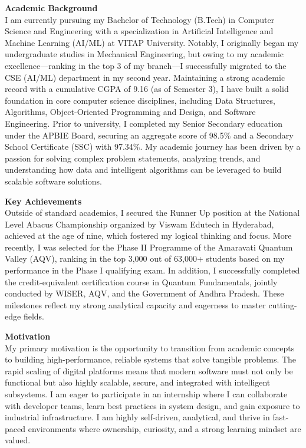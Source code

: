 \documentclass[a4paper,11pt]{article}
\begin{document}
\begin{justify}
\setlength{\parindent}{0pt}
\setlength{\parskip}{1.2em}

\textbf{Academic Background} \\
I am currently pursuing my Bachelor of Technology (B.Tech) in Computer Science and Engineering with a specialization in Artificial Intelligence and Machine Learning (AI/ML) at VITAP University. Notably, I originally began my undergraduate studies in Mechanical Engineering, but owing to my academic excellence—ranking in the top 3 of my branch—I successfully migrated to the CSE (AI/ML) department in my second year. Maintaining a strong academic record with a cumulative CGPA of 9.16 (as of Semester 3), I have built a solid foundation in core computer science disciplines, including Data Structures, Algorithms, Object-Oriented Programming and Design, and Software Engineering. Prior to university, I completed my Senior Secondary education under the APBIE Board, securing an aggregate score of 98.5\% and a Secondary School Certificate (SSC) with 97.34\%. My academic journey has been driven by a passion for solving complex problem statements, analyzing trends, and understanding how data and intelligent algorithms can be leveraged to build scalable software solutions.

\textbf{Key Achievements} \\
Outside of standard academics, I secured the Runner Up position at the National Level Abacus Championship organized by Viswam Edutech in Hyderabad, achieved at the age of nine, which fostered my logical thinking and focus. More recently, I was selected for the Phase II Programme of the Amaravati Quantum Valley (AQV), ranking in the top 3,000 out of 63,000+ students based on my performance in the Phase I qualifying exam. In addition, I successfully completed the credit-equivalent certification course in Quantum Fundamentals, jointly conducted by WISER, AQV, and the Government of Andhra Pradesh. These milestones reflect my strong analytical capacity and eagerness to master cutting-edge fields.

\textbf{Motivation} \\
My primary motivation is the opportunity to transition from academic concepts to building high-performance, reliable systems that solve tangible problems. The rapid scaling of digital platforms means that modern software must not only be functional but also highly scalable, secure, and integrated with intelligent subsystems. I am eager to participate in an internship where I can collaborate with developer teams, learn best practices in system design, and gain exposure to industrial infrastructure. I am highly self-driven, analytical, and thrive in fast-paced environments where ownership, curiosity, and a strong learning mindset are valued.


\end{justify}
\end{document}
